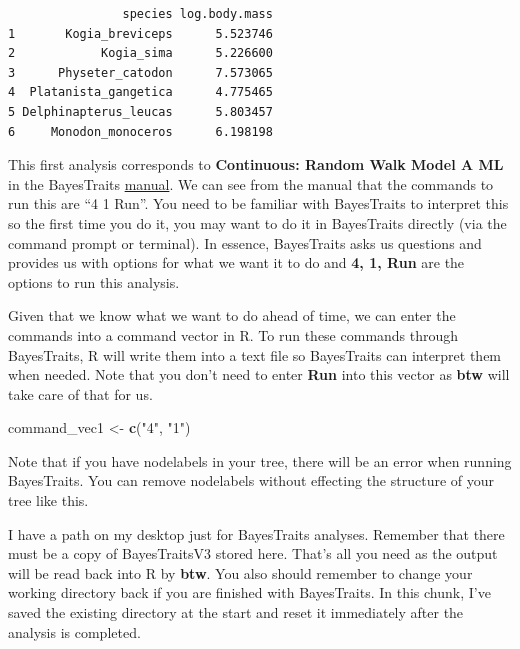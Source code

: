 \documentclass[
]{book}
\newenvironment{Shaded}{\begin{snugshade}}{\end{snugshade}}
\newcommand{\KeywordTok}[1]{\textcolor[rgb]{0.13,0.29,0.53}{\textbf{#1}}}
\newcommand{\NormalTok}[1]{#1}
\newcommand{\OperatorTok}[1]{\textcolor[rgb]{0.81,0.36,0.00}{\textbf{#1}}}
\newcommand{\OtherTok}[1]{\textcolor[rgb]{0.56,0.35,0.01}{#1}}
\newcommand{\StringTok}[1]{\textcolor[rgb]{0.31,0.60,0.02}{#1}}
\begin{document}
\begin{verbatim}
                species log.body.mass
1       Kogia_breviceps      5.523746
2            Kogia_sima      5.226600
3      Physeter_catodon      7.573065
4  Platanista_gangetica      4.775465
5 Delphinapterus_leucas      5.803457
6     Monodon_monoceros      6.198198
\end{verbatim}

This first analysis corresponds to \textbf{Continuous: Random Walk Model A ML} in the BayesTraits \href{http://www.evolution.rdg.ac.uk/BayesTraitsV3.0.2/Files/BayesTraitsV3.0.2Manual.pdf}{manual}. We can see from the manual that the commands to run this are ``4 1 Run''. You need to be familiar with BayesTraits to interpret this so the first time you do it, you may want to do it in BayesTraits directly (via the command prompt or terminal). In essence, BayesTraits asks us questions and provides us with options for what we want it to do and \textbf{4, 1, Run} are the options to run this analysis.

Given that we know what we want to do ahead of time, we can enter the commands into a command vector in R. To run these commands through BayesTraits, R will write them into a text file so BayesTraits can interpret them when needed. Note that you don't need to enter \textbf{Run} into this vector as \textbf{btw} will take care of that for us.

\begin{Shaded}
\begin{Highlighting}[]
\NormalTok{command\_vec1 \textless{}{-}}\StringTok{ }\KeywordTok{c}\NormalTok{(}\StringTok{"4"}\NormalTok{, }\StringTok{"1"}\NormalTok{)}
\end{Highlighting}
\end{Shaded}

Note that if you have nodelabels in your tree, there will be an error when running BayesTraits. You can remove nodelabels without effecting the structure of your tree like this.

\begin{Shaded}
\end{Shaded}

I have a path on my desktop just for BayesTraits analyses. Remember that there must be a copy of BayesTraitsV3 stored here. That's all you need as the output will be read back into R by \textbf{btw}. You also should remember to change your working directory back if you are finished with BayesTraits. In this chunk, I've saved the existing directory at the start and reset it immediately after the analysis is completed.
\end{document}
